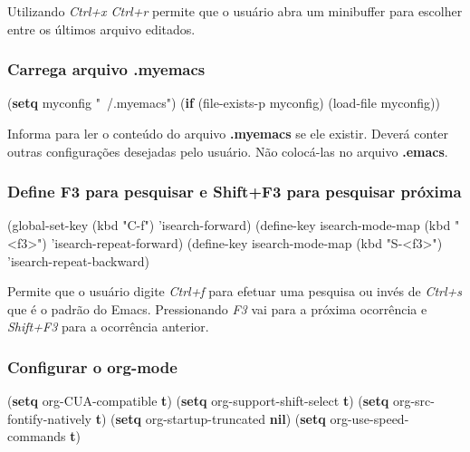 \documentclass[]{article}
\newenvironment{Shaded}{}{}
\newcommand{\KeywordTok}[1]{\textcolor[rgb]{0.00,0.44,0.13}{\textbf{{#1}}}}
\newcommand{\StringTok}[1]{\textcolor[rgb]{0.25,0.44,0.63}{{#1}}}
\newcommand{\NormalTok}[1]{{#1}}
\begin{document}
Utilizando \emph{Ctrl+x Ctrl+r} permite que o usuário abra um minibuffer
para escolher entre os últimos arquivo editados.

\subsubsection{Carrega arquivo .myemacs}\label{carrega-arquivo-.myemacs}

\begin{Shaded}
\begin{Highlighting}[]
\NormalTok{(}\KeywordTok{setq} \NormalTok{myconfig }\StringTok{"~/.myemacs"}\NormalTok{)}
\NormalTok{(}\KeywordTok{if} \NormalTok{(file-exists-p myconfig)}
    \NormalTok{(load-file myconfig))}
\end{Highlighting}
\end{Shaded}

Informa para ler o conteúdo do arquivo \textbf{.myemacs} se ele existir.
Deverá conter outras configurações desejadas pelo usuário. Não
colocá-las no arquivo \textbf{.emacs}.

\subsubsection{Define F3 para pesquisar e Shift+F3 para pesquisar
próxima}\label{define-f3-para-pesquisar-e-shiftf3-para-pesquisar-pruxf3xima}

\begin{Shaded}
\begin{Highlighting}[]
\NormalTok{(global-set-key (kbd }\StringTok{"C-f"}\NormalTok{) 'isearch-forward)}
\NormalTok{(define-key isearch-mode-map (kbd }\StringTok{"<f3>"}\NormalTok{)}
  \NormalTok{'isearch-repeat-forward)}
\NormalTok{(define-key isearch-mode-map (kbd }\StringTok{"S-<f3>"}\NormalTok{)}
  \NormalTok{'isearch-repeat-backward)}
\end{Highlighting}
\end{Shaded}

Permite que o usuário digite \emph{Ctrl+f} para efetuar uma pesquisa ou
invés de \emph{Ctrl+s} que é o padrão do Emacs. Pressionando \emph{F3}
vai para a próxima ocorrência e \emph{Shift+F3} para a ocorrência
anterior.

\subsubsection{Configurar o org-mode}\label{configurar-o-org-mode}

\begin{Shaded}
\begin{Highlighting}[]
\NormalTok{(}\KeywordTok{setq} \NormalTok{org-CUA-compatible }\KeywordTok{t}\NormalTok{)}
\NormalTok{(}\KeywordTok{setq} \NormalTok{org-support-shift-select }\KeywordTok{t}\NormalTok{)}
\NormalTok{(}\KeywordTok{setq} \NormalTok{org-src-fontify-natively }\KeywordTok{t}\NormalTok{)}
\NormalTok{(}\KeywordTok{setq} \NormalTok{org-startup-truncated }\KeywordTok{nil}\NormalTok{)}
\NormalTok{(}\KeywordTok{setq} \NormalTok{org-use-speed-commands }\KeywordTok{t}\NormalTok{)}
\end{Highlighting}
\end{Shaded}
\end{document}
